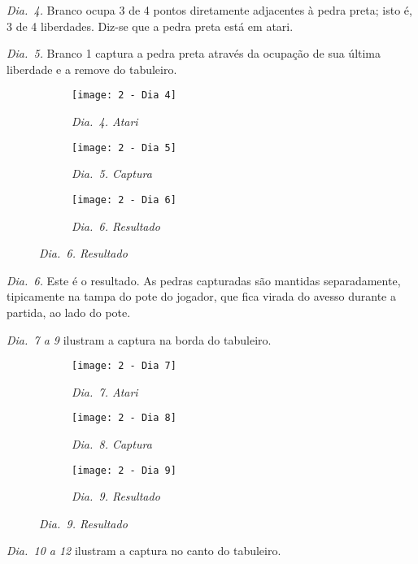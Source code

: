 \emph{Dia.\@~4.} Branco ocupa 3 de 4 pontos diretamente adjacentes à pedra preta; isto é, 3 de 4 liberdades. Diz-se que a pedra preta está em atari.

\emph{Dia.\@~5.} Branco 1 captura a pedra preta através da ocupação de sua última liberdade e a remove do tabuleiro.

\begin{figure}[h]
    \centering
    \begin{subfigure}{.3\textwidth}
        \centering
        \texttt{[image: 2 - Dia 4]}
        \caption*{\emph{Dia.\@~4. Atari}}
    \end{subfigure}
    \begin{subfigure}{.3\textwidth}
        \centering
        \texttt{[image: 2 - Dia 5]}
        \caption*{\emph{Dia.\@~5. Captura}}
    \end{subfigure}
    \begin{subfigure}{.3\textwidth}
        \centering
        \texttt{[image: 2 - Dia 6]}
        \caption*{\emph{Dia.\@~6. Resultado}}
    \end{subfigure}
\end{figure}

\emph{Dia.\@~6.} Este é o resultado. As pedras capturadas são mantidas separadamente, tipicamente na tampa do pote do jogador, que fica virada do avesso durante a partida, ao lado do pote.

\emph{Dia.\@~7 a 9} ilustram a captura na borda do tabuleiro.

\begin{figure}[h]
    \centering
    \begin{subfigure}{.3\textwidth}
        \centering
        \texttt{[image: 2 - Dia 7]}
        \caption*{\emph{Dia.\@~7. Atari}}
    \end{subfigure}
    \begin{subfigure}{.3\textwidth}
        \centering
        \texttt{[image: 2 - Dia 8]}
        \caption*{\emph{Dia.\@~8. Captura}}
    \end{subfigure}
    \begin{subfigure}{.3\textwidth}
        \centering
        \texttt{[image: 2 - Dia 9]}
        \caption*{\emph{Dia.\@~9. Resultado}}
    \end{subfigure}
\end{figure}

\emph{Dia.\@~10 a 12} ilustram a captura no canto do tabuleiro.

